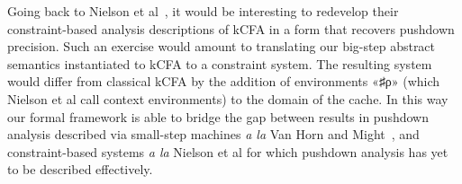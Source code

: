 Going back to Nielson et al~\cite{dvanhorn:Neilson:1999}, it would be
interesting to redevelop their constraint-based analysis descriptions of kCFA
in a form that recovers pushdown precision. Such an exercise would amount to
translating our big-step abstract semantics instantiated to kCFA to a
constraint system. The resulting system would differ from classical kCFA by the
addition of environments «♯{ρ}» (which Nielson et al call context environments)
to the domain of the cache. In this way our formal framework is able to bridge
the gap between results in pushdown analysis described via small-step machines
\emph{a la} Van Horn and Might~\cite{dvanhorn:VanHorn2010Abstracting}, and
constraint-based systems \emph{a la} Nielson et al for which pushdown analysis
has yet to be described effectively.
